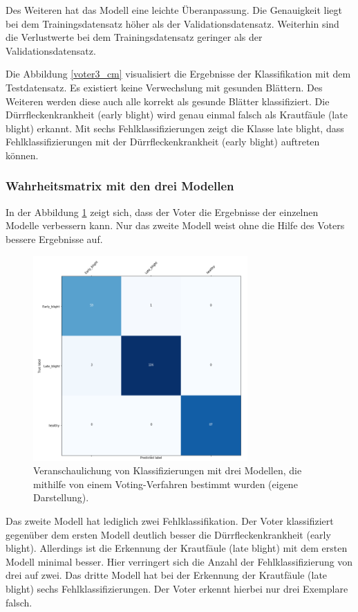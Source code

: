 Des Weiteren hat das Modell eine leichte Überanpassung. Die Genauigkeit liegt bei dem Trainingsdatensatz höher als der Validationsdatensatz. Weiterhin sind die Verlustwerte bei dem Trainingsdatensatz geringer als der Validationsdatensatz.

Die Abbildung \ref{voter3_cm} visualisiert die Ergebnisse der Klassifikation mit dem Testdatensatz. Es existiert keine Verwechslung mit gesunden Blättern. Des Weiteren werden diese auch alle korrekt als gesunde Blätter klassifiziert. Die Dürrfleckenkrankheit (early blight) wird genau einmal falsch als Krautfäule (late blight) erkannt. Mit sechs Fehlklassifizierungen zeigt die Klasse \glqq late blight\grqq, dass Fehlklassifizierungen mit der Dürrfleckenkrankheit (early blight) auftreten können.


\subsubsection{Wahrheitsmatrix mit den drei Modellen}

In der Abbildung \ref{voter_combined} zeigt sich, dass der Voter die Ergebnisse der einzelnen Modelle verbessern kann. Nur das zweite Modell weist ohne die Hilfe des Voters bessere Ergebnisse auf.

\begin{figure}[h!]
	\centering
	\includegraphics[width=0.73\textwidth]{bilder/voter.PNG}
	\caption{Veranschaulichung von Klassifizierungen mit drei Modellen, die mithilfe von einem Voting-Verfahren bestimmt wurden (eigene Darstellung).}
	\label{voter_combined}
\end{figure}


Das zweite Modell hat lediglich zwei Fehlklassifikation. Der Voter klassifiziert gegenüber dem ersten Modell deutlich besser die Dürrfleckenkrankheit (early blight). Allerdings ist die Erkennung der Krautfäule (late blight) mit dem ersten Modell minimal besser. Hier verringert sich die Anzahl der Fehlklassifizierung von drei auf zwei. Das dritte Modell hat bei der Erkennung der Krautfäule (late blight) sechs Fehlklassifizierungen. Der Voter erkennt hierbei nur drei Exemplare falsch.


